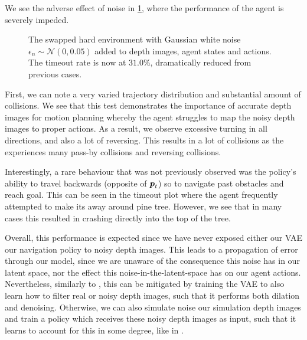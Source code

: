 We see the adverse effect of noise in \cref{fig:hard_swapped_random_depth}, where the performance of the agent is severely impeded.
\begin{figure}[htb]
    \centering
    \caption{The swapped hard environment with Gaussian white noise $\epsilon_n \sim \mathcal{N}(0, 0.05)$ added to depth images, agent states and actions. The timeout rate is now at $31.0\%$, dramatically reduced from previous cases.}
    \label{fig:hard_swapped_random_depth}
\end{figure}
First, we can note a very varied trajectory distribution and substantial amount of collisions. We see that this test demonstrates the importance of accurate depth images for motion planning whereby the agent struggles to map the noisy depth images to proper actions. As a result, we observe excessive turning in all directions, and also a lot of reversing. 
This results in a lot of collisions as the experiences many pass-by collisions and reversing collisions.

Interestingly, a rare behaviour that was not previously observed was the policy's ability to travel backwards (opposite of ${\boldsymbol{p}}_t$) so to navigate past obstacles and reach goal. This can be seen in the timeout plot where the agent frequently attempted to make its away around pine tree. However, we see that in many cases this resulted in crashing directly into the top of the tree.

Overall, this performance is expected since we have never exposed either our VAE our navigation policy to noisy depth images. This leads to a propagation of error through our model, since we are unaware of the consequence this noise has in our latent space, nor the effect this noise-in-the-latent-space has on our agent actions. Nevertheless, similarly to \cite{LearningStateRepresentation}, this can be mitigated by training the VAE to also learn how to filter real or noisy depth images, such that it performs both dilation and denoising. Otherwise, we can also simulate noise our simulation depth images and train a policy which receives these noisy depth images as input, such that it learns to account for this in some degree, like in \cite{HighSpeedFlightWild}.



